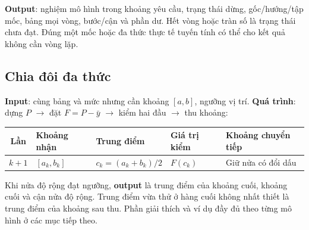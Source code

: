 \textbf{Output}: nghiệm mô hình trong khoảng yêu cầu, trạng thái dừng, gốc/hướng/tập mốc, bảng mọi vòng, bước/cận và phần dư. Hết vòng hoặc tràn số là trạng thái chưa đạt. Đúng một mốc hoặc đa thức thực tế tuyến tính có thể cho kết quả không cần vòng lặp.

\subsection{Chia đôi đa thức}
\textbf{Input}: cùng bảng và mức nhưng cần khoảng $[a,b]$, ngưỡng vị trí. \textbf{Quá trình}: dựng $P$ $\to$ đặt $F=P-\bar y$ $\to$ kiểm hai đầu $\to$ thu khoảng:
\begin{center}\small\begin{tabular}{cllll}\toprule
Lần&Khoảng nhận&Trung điểm&Giá trị kiểm&Khoảng chuyển tiếp\\\midrule
$k+1$&$[a_k,b_k]$&$c_k=(a_k+b_k)/2$&$F(c_k)$&Giữ nửa có đổi dấu\\\bottomrule
\end{tabular}\end{center}
Khi nửa độ rộng đạt ngưỡng, \textbf{output} là trung điểm của khoảng cuối, khoảng cuối và cận nửa độ rộng. Trung điểm vừa thử ở hàng cuối không nhất thiết là trung điểm của khoảng sau thu. Phần giải thích và ví dụ đầy đủ theo từng mô hình ở các mục tiếp theo.

